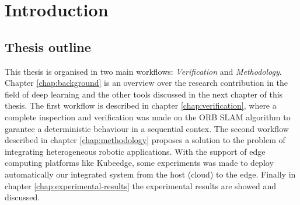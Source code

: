 \chapter{Introduction} 

\section{Thesis outline}
This thesis is organised in two main workflows: \textit{Verification} and \textit{Methodology}.
Chapter \ref{chap:background} is an overview over the research contribution in the field of  deep learning and the other tools discussed in the next chapter of this thesis.
The first workflow is described in chapter \ref{chap:verification}, where a complete inspection and verification was made on the ORB SLAM algorithm to garantee  a deterministic behaviour in a sequential contex.
The second workflow described in chapter \ref{chap:methodology} proposes a solution to the problem of integrating heterogeneous robotic applications.
With the support of edge computing platforms like Kubeedge, some experiments was made to deploy automatically our integrated system from the host (cloud) to the edge.
Finally in chapter \ref{chap:experimental-results} the experimental results are showed and discussed.


\thispagestyle{empty}